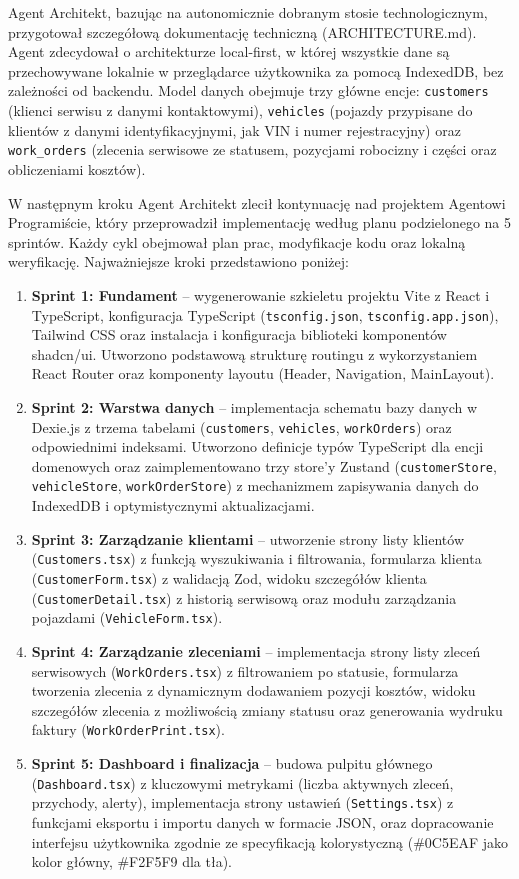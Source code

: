 Agent Architekt, bazując na autonomicznie dobranym stosie technologicznym, przygotował szczegółową dokumentację techniczną (ARCHITECTURE.md). Agent zdecydował o architekturze local-first, w której wszystkie dane są przechowywane lokalnie w przeglądarce użytkownika za pomocą IndexedDB, bez zależności od backendu. Model danych obejmuje trzy główne encje: \texttt{customers} (klienci serwisu z danymi kontaktowymi), \texttt{vehicles} (pojazdy przypisane do klientów z danymi identyfikacyjnymi, jak VIN i numer rejestracyjny) oraz \texttt{work\_orders} (zlecenia serwisowe ze statusem, pozycjami robocizny i części oraz obliczeniami kosztów).

W następnym kroku Agent Architekt zlecił kontynuację nad projektem Agentowi Programiście, który przeprowadził implementację według planu podzielonego na 5 sprintów. Każdy cykl obejmował plan prac, modyfikacje kodu oraz lokalną weryfikację. Najważniejsze kroki przedstawiono poniżej:
\begin{enumerate}
    \item \textbf{Sprint 1: Fundament} -- wygenerowanie szkieletu projektu Vite z React i TypeScript, konfiguracja TypeScript (\texttt{tsconfig.json}, \texttt{tsconfig.app.json}), Tailwind CSS oraz instalacja i konfiguracja biblioteki komponentów shadcn/ui. Utworzono podstawową strukturę routingu z wykorzystaniem React Router oraz komponenty layoutu (Header, Navigation, MainLayout).
    \item \textbf{Sprint 2: Warstwa danych} -- implementacja schematu bazy danych w Dexie.js z trzema tabelami (\texttt{customers}, \texttt{vehicles}, \texttt{workOrders}) oraz odpowiednimi indeksami. Utworzono definicje typów TypeScript dla encji domenowych oraz zaimplementowano trzy store'y Zustand (\texttt{customerStore}, \texttt{vehicleStore}, \texttt{workOrderStore}) z mechanizmem zapisywania danych do IndexedDB i optymistycznymi aktualizacjami.
    \item \textbf{Sprint 3: Zarządzanie klientami} -- utworzenie strony listy klientów (\texttt{Customers.tsx}) z funkcją wyszukiwania i filtrowania, formularza klienta (\texttt{CustomerForm.tsx}) z walidacją Zod, widoku szczegółów klienta (\texttt{CustomerDetail.tsx}) z historią serwisową oraz modułu zarządzania pojazdami (\texttt{VehicleForm.tsx}).
    \item \textbf{Sprint 4: Zarządzanie zleceniami} -- implementacja strony listy zleceń serwisowych (\texttt{WorkOrders.tsx}) z filtrowaniem po statusie, formularza tworzenia zlecenia z dynamicznym dodawaniem pozycji kosztów, widoku szczegółów zlecenia z możliwością zmiany statusu oraz generowania wydruku faktury (\texttt{WorkOrderPrint.tsx}).
    \item \textbf{Sprint 5: Dashboard i finalizacja} -- budowa pulpitu głównego (\texttt{Dashboard.tsx}) z kluczowymi metrykami (liczba aktywnych zleceń, przychody, alerty), implementacja strony ustawień (\texttt{Settings.tsx}) z funkcjami eksportu i importu danych w formacie JSON, oraz dopracowanie interfejsu użytkownika zgodnie ze specyfikacją kolorystyczną (\#0C5EAF jako kolor główny, \#F2F5F9 dla tła).
\end{enumerate}

